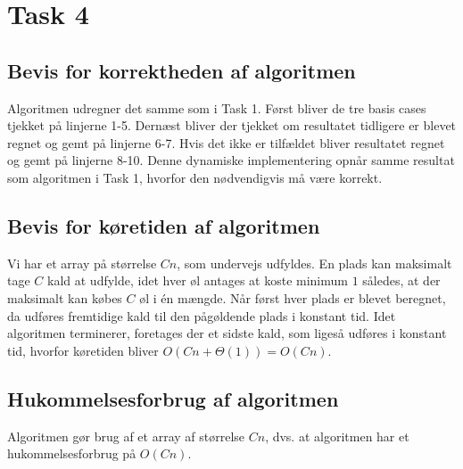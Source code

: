 \section{Task 4}
\subsection{Bevis for korrektheden af algoritmen}

Algoritmen udregner det samme som i Task 1. Først bliver de tre basis cases tjekket på linjerne 1-5. Dernæst bliver der tjekket om resultatet tidligere er blevet regnet og gemt på linjerne 6-7. Hvis det ikke er tilfældet bliver resultatet regnet og gemt på linjerne 8-10. Denne dynamiske implementering opnår samme resultat som algoritmen i Task 1, hvorfor den nødvendigvis må være korrekt. 

\subsection{Bevis for køretiden af algoritmen}

Vi har et array på størrelse $Cn$, som undervejs udfyldes.
En plads kan maksimalt tage $C$ kald at udfylde, idet hver øl antages at koste minimum $1$ således, at der maksimalt kan købes $C$ øl i én mængde. 
Når først hver plads er blevet beregnet, da udføres fremtidige kald til den pågøldende plads i konstant tid. Idet algoritmen terminerer, foretages der et sidste kald, som ligeså udføres i konstant tid, hvorfor køretiden bliver $O(Cn+\Theta(1)) = O(Cn)$.

\subsection{Hukommelsesforbrug af algoritmen}
Algoritmen gør brug af et array af størrelse $Cn$, dvs.
at algoritmen har et hukommelsesforbrug på $O(Cn)$.

